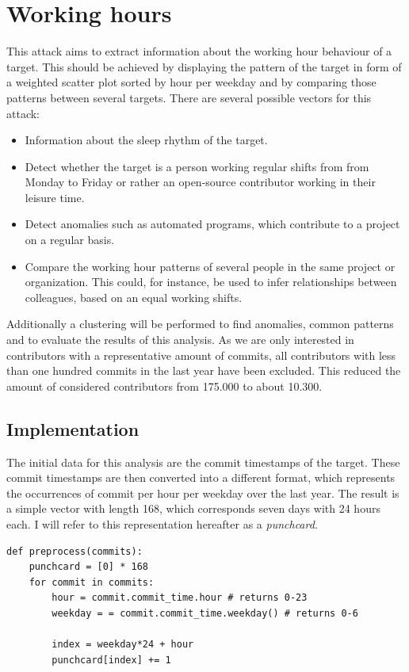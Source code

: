 \section{Working hours}

This attack aims to extract information about the working hour behaviour of a target.
This should be achieved by displaying the pattern of the target in form of a weighted scatter plot sorted by hour per weekday and by comparing those patterns between several targets.
There are several possible vectors for this attack:

\begin{itemize}
    \item Information about the sleep rhythm of the target.
    \item Detect whether the target is a person working regular shifts from from Monday to Friday or rather an open-source contributor working in their leisure time.
    \item Detect anomalies such as automated programs, which contribute to a project on a regular basis.
    \item Compare the working hour patterns of several people in the same project or organization. This could, for instance, be used to infer relationships between colleagues, based on an equal working shifts.
\end{itemize}

Additionally a clustering will be performed to find anomalies, common patterns and to evaluate the results of this analysis.
As we are only interested in contributors with a representative amount of commits, all contributors with less than one hundred commits in the last year have been excluded.
This reduced the amount of considered contributors from 175.000 to about 10.300.


\subsection{Implementation}\label{punchcard-implementation}

The initial data for this analysis are the commit timestamps of the target.
These commit timestamps are then converted into a different format, which represents the occurrences of commit per hour per weekday over the last year.
The result is a simple vector with length 168, which corresponds seven days with 24 hours each.
I will refer to this representation hereafter as a \emph{punchcard}.

\begin{verbatim}
def preprocess(commits):
    punchcard = [0] * 168
    for commit in commits:
        hour = commit.commit_time.hour # returns 0-23
        weekday = = commit.commit_time.weekday() # returns 0-6

        index = weekday*24 + hour
        punchcard[index] += 1

\end{verbatim}
\begingroup
{}\label{lst:puchcard-preprocessing}
\endgroup


